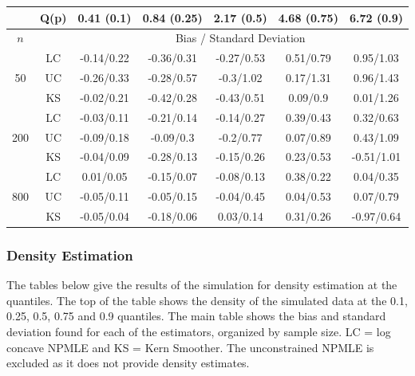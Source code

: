 \documentclass[10pt]{article}
\begin{document}
\begin{center}
\begin{table}[H]
\begin{tabular} {| c | c | c | c | c | c | c | }
	 \hline
		&Q(p)&	0.41 (0.1)&	0.84 (0.25)&	2.17 (0.5)&	4.68 (0.75)&	6.72 (0.9)\\ 
 \hline 
 	$n$ & & \multicolumn{5}{|c|}{Bias / Standard Deviation} 
 \\ 
 \hline 
\multirow{3}{*}{50}		&	LC	&-0.14/0.22	&-0.36/0.31	&-0.27/0.53	&0.51/0.79	&0.95/1.03\\ 
			&	UC	&-0.26/0.33	&-0.28/0.57	&-0.3/1.02	&0.17/1.31	&0.96/1.43\\ 
			&	KS	&-0.02/0.21	&-0.42/0.28	&-0.43/0.51	&0.09/0.9	&0.01/1.26\\ 
	\hline 
\multirow{3}{*}{200}		&	LC	&-0.03/0.11	&-0.21/0.14	&-0.14/0.27	&0.39/0.43	&0.32/0.63\\ 
			&	UC	&-0.09/0.18	&-0.09/0.3	&-0.2/0.77	&0.07/0.89	&0.43/1.09\\ 
			&	KS	&-0.04/0.09	&-0.28/0.13	&-0.15/0.26	&0.23/0.53	&-0.51/1.01\\ 
	\hline 
\multirow{3}{*}{800}		&	LC	&0.01/0.05	&-0.15/0.07	&-0.08/0.13	&0.38/0.22	&0.04/0.35\\ 
			&	UC	&-0.05/0.11	&-0.05/0.15	&-0.04/0.45	&0.04/0.53	&0.07/0.79\\ 
			&	KS	&-0.05/0.04	&-0.18/0.06	&0.03/0.14	&0.31/0.26	&-0.97/0.64\\ 
	\hline 

\end{tabular}

\end{table}
	
\end{center}
	
	{\subsubsection{Density Estimation} } 
	
	The tables below give the results of the simulation for density estimation at the quantiles. The top of the table shows the density of the simulated data at the  0.1, 0.25, 0.5, 0.75 and 0.9 quantiles. The main table shows the bias and standard deviation found for each of the estimators, organized by sample size. LC = log concave NPMLE and KS = Kern Smoother. The unconstrained NPMLE is excluded as it does not provide density estimates. 
\end{document}
